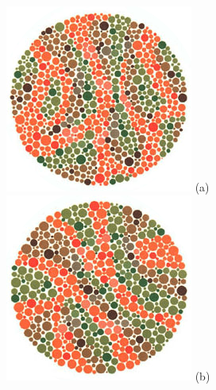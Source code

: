 \documentclass[	12pt, Times, openright, twoside, a4paper, english, brazil]{abntex2}
\begin{document}
\begin{apendicesenv}
\begin{figure}[!htb]
\centering
{\includegraphics[width=\linewidth]{ishihara-digitoescondido/plate18.png}}
(a)
\endminipage\hfill
{}
\centering
{\includegraphics[width=\linewidth]{ishihara-digitoescondido/plate19.png}}
(b)
\endminipage\hfill


\end{figure}
\end{apendicesenv}
\end{document}
